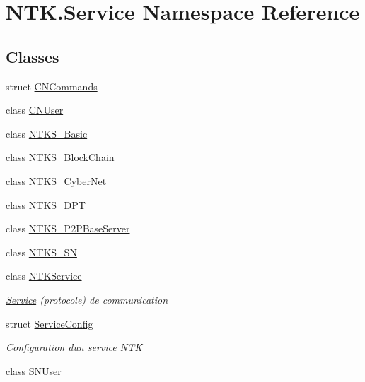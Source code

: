 \hypertarget{namespace_n_t_k_1_1_service}{}\section{N\+T\+K.\+Service Namespace Reference}
\label{namespace_n_t_k_1_1_service}
\subsection*{Classes}
\begin{DoxyCompactItemize}
\item 
struct \mbox{\hyperlink{struct_n_t_k_1_1_service_1_1_c_n_commands}{C\+N\+Commands}}
\item 
class \mbox{\hyperlink{class_n_t_k_1_1_service_1_1_c_n_user}{C\+N\+User}}
\item 
class \mbox{\hyperlink{class_n_t_k_1_1_service_1_1_n_t_k_s___basic}{N\+T\+K\+S\+\_\+\+Basic}}
\item 
class \mbox{\hyperlink{class_n_t_k_1_1_service_1_1_n_t_k_s___block_chain}{N\+T\+K\+S\+\_\+\+Block\+Chain}}
\item 
class \mbox{\hyperlink{class_n_t_k_1_1_service_1_1_n_t_k_s___cyber_net}{N\+T\+K\+S\+\_\+\+Cyber\+Net}}
\item 
class \mbox{\hyperlink{class_n_t_k_1_1_service_1_1_n_t_k_s___d_p_t}{N\+T\+K\+S\+\_\+\+D\+PT}}
\item 
class \mbox{\hyperlink{class_n_t_k_1_1_service_1_1_n_t_k_s___p2_p_base_server}{N\+T\+K\+S\+\_\+\+P2\+P\+Base\+Server}}
\item 
class \mbox{\hyperlink{class_n_t_k_1_1_service_1_1_n_t_k_s___s_n}{N\+T\+K\+S\+\_\+\+SN}}
\item 
class \mbox{\hyperlink{class_n_t_k_1_1_service_1_1_n_t_k_service}{N\+T\+K\+Service}}
\begin{DoxyCompactList}\small\item\em \mbox{\hyperlink{namespace_n_t_k_1_1_service}{Service}} (protocole) de communication \end{DoxyCompactList}\item 
struct \mbox{\hyperlink{struct_n_t_k_1_1_service_1_1_service_config}{Service\+Config}}
\begin{DoxyCompactList}\small\item\em Configuration d\textquotesingle{}un service \mbox{\hyperlink{namespace_n_t_k}{N\+TK}} \end{DoxyCompactList}\item 
class \mbox{\hyperlink{class_n_t_k_1_1_service_1_1_s_n_user}{S\+N\+User}}
\end{DoxyCompactItemize}
